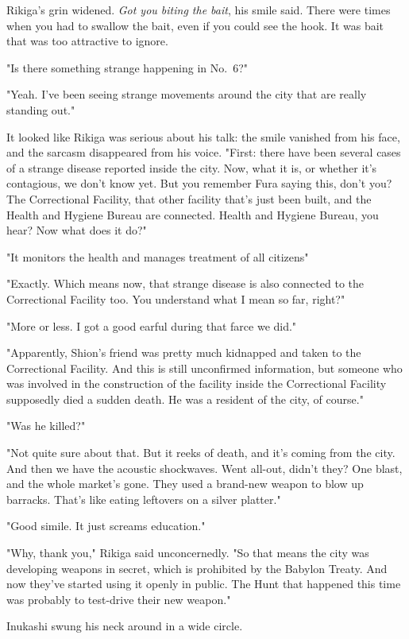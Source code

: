 Rikiga's grin widened. \emph{Got you biting the bait}, his smile said. There
were times when you had to swallow the bait, even if you could see the
hook. It was bait that was too attractive to ignore.

"Is there something strange happening in No.~6?"

"Yeah. I've been seeing strange movements around the city that are
really standing out."

It looked like Rikiga was serious about his talk: the smile vanished
from his face, and the sarcasm disappeared from his voice. "First: there
have been several cases of a strange disease reported inside the city.
Now, what it is, or whether it's contagious, we don't know yet. But you
remember Fura saying this, don't you? The Correctional Facility, that
other facility that's just been built, and the Health and Hygiene Bureau
are connected. Health and Hygiene Bureau, you hear? Now what does it
do?"

"It monitors the health and manages treatment of all citizens\el "

"Exactly. Which means now, that strange disease is also connected to the
Correctional Facility too. You understand what I mean so far, right?"

"More or less. I got a good earful during that farce we did."

"Apparently, Shion's friend was pretty much kidnapped and taken to the
Correctional Facility. And this is still unconfirmed information, but\el 
someone who was involved in the construction of the facility inside the
Correctional Facility supposedly died a sudden death. He was a resident
of the city, of course."

"Was he killed?"

"Not quite sure about that. But it reeks of death, and it's coming from
the city. And then we have the acoustic shockwaves. Went all-out, didn't
they? One blast, and the whole market's gone. They used a brand-new
weapon to blow up barracks. That's like eating leftovers on a silver
platter."

"Good simile. It just screams education."

"Why, thank you," Rikiga said unconcernedly. "So that means the city was
developing weapons in secret, which is prohibited by the Babylon Treaty.
And now they've started using it openly in public. The Hunt that
happened this time was probably to test-drive their new weapon."

Inukashi swung his neck around in a wide circle.

